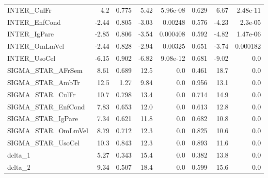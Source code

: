 \begin{tabular}{lrrrrrrr}
INTER\_CulFr        &    4.2 &    0.775 &    5.42 & 5.96e-08 &         0.629 &         6.67 &      2.48e-11 \\
INTER\_EnfCond      &  -2.44 &    0.805 &   -3.03 &  0.00248 &         0.576 &        -4.23 &       2.3e-05 \\
INTER\_IgPare       &  -2.85 &    0.806 &   -3.54 & 0.000408 &         0.592 &        -4.82 &      1.47e-06 \\
INTER\_OmLmVel      &  -2.44 &    0.828 &   -2.94 &  0.00325 &         0.651 &        -3.74 &      0.000182 \\
INTER\_UsoCel       &  -6.15 &    0.902 &   -6.82 & 9.08e-12 &         0.681 &        -9.02 &           0.0 \\
SIGMA\_STAR\_AFrSem  &   8.61 &    0.689 &    12.5 &      0.0 &         0.461 &         18.7 &           0.0 \\
SIGMA\_STAR\_AmbTr   &   12.5 &     1.27 &    9.84 &      0.0 &         0.956 &         13.1 &           0.0 \\
SIGMA\_STAR\_CulFr   &   10.7 &    0.798 &    13.4 &      0.0 &         0.714 &         14.9 &           0.0 \\
SIGMA\_STAR\_EnfCond &   7.83 &    0.653 &    12.0 &      0.0 &         0.613 &         12.8 &           0.0 \\
SIGMA\_STAR\_IgPare  &   7.34 &    0.621 &    11.8 &      0.0 &         0.682 &         10.8 &           0.0 \\
SIGMA\_STAR\_OmLmVel &   8.79 &    0.712 &    12.3 &      0.0 &         0.825 &         10.6 &           0.0 \\
SIGMA\_STAR\_UsoCel  &   10.3 &    0.843 &    12.3 &      0.0 &         0.893 &         11.6 &           0.0 \\
delta\_1            &   5.27 &    0.343 &    15.4 &      0.0 &         0.382 &         13.8 &           0.0 \\
delta\_2            &   9.34 &    0.507 &    18.4 &      0.0 &         0.599 &         15.6 &           0.0 \\
\bottomrule
\end{tabular}

